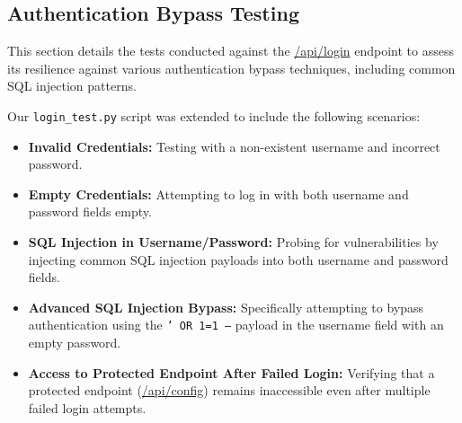 \documentclass{article}
\begin{document}
\subsection{Authentication Bypass Testing}
This section details the tests conducted against the \url{/api/login} endpoint to assess its resilience against various authentication bypass techniques, including common SQL injection patterns.

Our \texttt{login\_test.py} script was extended to include the following scenarios:
\begin{itemize}
    \item \textbf{Invalid Credentials:} Testing with a non-existent username and incorrect password.
    \item \textbf{Empty Credentials:} Attempting to log in with both username and password fields empty.
    \item \textbf{SQL Injection in Username/Password:} Probing for vulnerabilities by injecting common SQL injection payloads into both username and password fields.
    \item \textbf{Advanced SQL Injection Bypass:} Specifically attempting to bypass authentication using the \texttt{' OR 1=1 --} payload in the username field with an empty password.
    \item \textbf{Access to Protected Endpoint After Failed Login:} Verifying that a protected endpoint (\url{/api/config}) remains inaccessible even after multiple failed login attempts.
\end{itemize}
\end{document}
